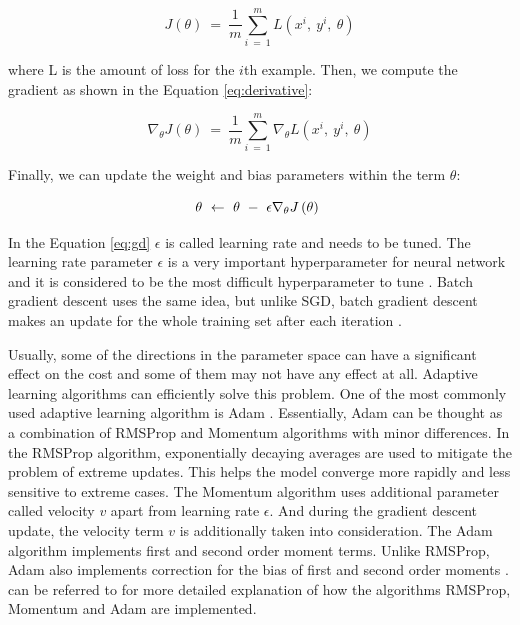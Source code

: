 \documentclass[a4paper, twoside]{templates/ociamthesis}
\begin{document}
\begin{equation}
J\left(\theta\right)\ =\ \frac{1}{m}\sum_{i\ =\ 1}^mL\left(x^i,\ y^i,\ \theta\right)
\label{eq:cs}
\end{equation}

where L is the amount of loss for the \(i\)th example. Then, we compute the gradient as shown in the Equation \eqref{eq:derivative}:

\begin{equation}
\nabla_{\theta}J\left(\theta\right)\ =\ \frac{1}{m}\sum_{i\ =\ 1}^m\nabla_{\theta}L\left(x^i,\ y^i,\ \theta\right)
\label{eq:derivative}
\end{equation}

Finally, we can update the weight and bias parameters within the term \(\theta\):

\begin{equation}
\theta\ \leftarrow\ \theta\ -\ \epsilon\\\nabla_{\theta}J\left(\theta\right)\
\label{eq:gd}
\end{equation}

In the Equation \eqref{eq:gd} \(\epsilon\) is called learning rate and needs to be tuned. The learning rate parameter \(\epsilon\) is a very important hyperparameter for neural network and it is considered to be the most difficult hyperparameter to tune \citep{goodfellow2016deep}. Batch gradient descent uses the same idea, but unlike SGD, batch gradient descent makes an update for the whole training set after each iteration \citep{ruder2016overview}.

Usually, some of the directions in the parameter space can have a significant effect on the cost and some of them may not have any effect at all. Adaptive learning algorithms can efficiently solve this problem. One of the most commonly used adaptive learning algorithm is Adam \citep{kingma2014adam}. Essentially, Adam can be thought as a combination of RMSProp \citep{hinton2012neural} and Momentum \citep{polyak1964some} algorithms with minor differences. In the RMSProp algorithm, exponentially decaying averages are used to mitigate the problem of extreme updates. This helps the model converge more rapidly and less sensitive to extreme cases. The Momentum algorithm uses additional parameter called velocity \(v\) apart from learning rate \(\epsilon\). And during the gradient descent update, the velocity term \(v\) is additionally taken into consideration. The Adam algorithm implements first and second order moment terms. Unlike RMSProp, Adam also implements correction for the bias of first and second order moments \citep{goodfellow2016deep}. \citet{goodfellow2016deep} can be referred to for more detailed explanation of how the algorithms RMSProp, Momentum and Adam are implemented.
\end{document}
